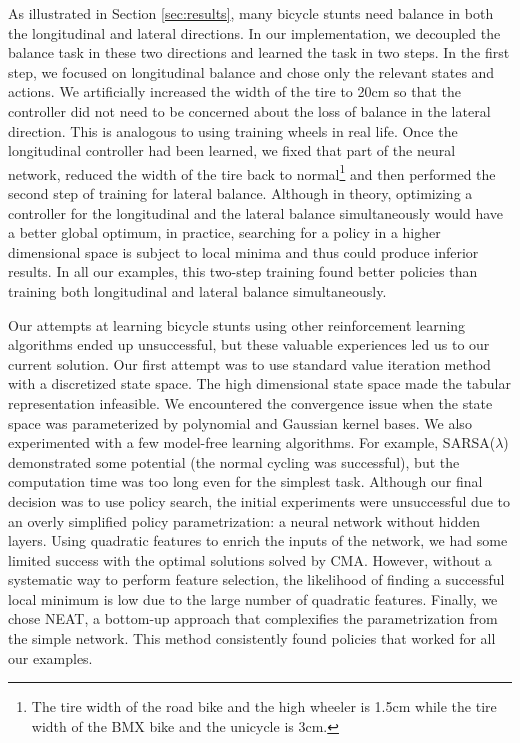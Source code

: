 As illustrated in Section \ref{sec:results}, many bicycle stunts need balance in both the longitudinal and lateral directions. In our implementation, we decoupled the balance task in these two directions and learned the task in two steps. In the first step, we focused on longitudinal balance and chose only the relevant states and actions. We artificially increased the width of the tire to 20cm so that the controller did not need to be concerned about the loss of balance in the lateral direction. This is analogous to using training wheels in real life. Once the longitudinal controller had been learned, we fixed that part of the neural network, reduced the width of the tire back to normal\footnote{The tire width of the road bike and the high wheeler is 1.5cm while the tire width of the BMX bike and the unicycle is 3cm.} and then performed the second step of training for lateral balance. Although in theory, optimizing a controller for the longitudinal and the lateral balance simultaneously would have a better global optimum, in practice, searching for a policy in a higher dimensional space is subject to local minima and thus could produce inferior results. In all our examples, this two-step training found better policies than training both longitudinal and lateral balance simultaneously.

Our attempts at learning bicycle stunts using other reinforcement learning algorithms ended up unsuccessful, but these valuable experiences led us to our current solution. Our first attempt was to use standard value iteration method with a discretized state space. The high dimensional state space made the tabular representation infeasible. We encountered the convergence issue when the state space was parameterized by polynomial and Gaussian kernel bases. We also experimented with a few model-free learning algorithms. For example, SARSA($\lambda$) demonstrated some potential (\ie the normal cycling was successful), but the computation time was too long even for the simplest task. Although our final decision was to use policy search, the initial experiments were unsuccessful due to an overly simplified policy parametrization: a neural network without hidden layers. Using quadratic features to enrich the inputs of the network, we had some limited success with the optimal solutions solved by CMA. However, without a systematic way to perform feature selection, the likelihood of finding a successful local minimum is low due to the large number of quadratic features. Finally, we chose NEAT, a bottom-up approach that complexifies the parametrization from the simple network. This method consistently found policies that worked for all our examples.

